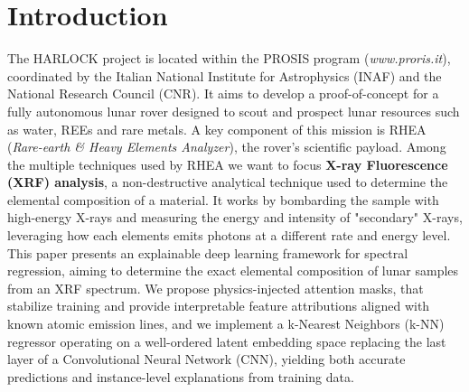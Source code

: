 \documentclass[11pt,twoside]{article}
\begin{document}
\begin{abstract}
Our approach exploits the CNN's latent representation and preservation of spatial features: after training, the final regression layer of the backbone model is replaced by a K-Nearest Neighbors (k-NN) regressor operating directly on the learned embedding space; as a result, every prediction is accompanied by an explanation in the form of the most similar spectra observed during training. This works particularly well thanks to a custom loss function designed to optimize the quality of the learned embedding space, without hindering performances. Furthermore, an attention mask is learned for each predicted element starting from a physics-based initialization, providing easily readable heatmaps as well in the form of a mask-by-weights product. Experimental results show that, in a regression task estimating the composition of soil samples, the average $R^2$ score over the predicted elements stays around 0.9 for both the original approach and the explainable Deep k-NN model.

\end{abstract}


\section{Introduction}
The HARLOCK project is located within the PROSIS program (\textit{www.proris.it}), coordinated by the Italian National Institute for Astrophysics (INAF) and the National Research Council (CNR). It aims to develop a  proof-of-concept for a fully autonomous lunar rover designed to scout and prospect lunar resources such as water, REEs and rare metals.
A key component of this mission is RHEA (\textit{Rare-earth \& Heavy Elements Analyzer}), the rover's scientific payload. Among the multiple techniques used by RHEA we want to focus \textbf{X-ray Fluorescence (XRF) analysis}, a non-destructive analytical technique used to determine the elemental composition of a material. It works by bombarding the sample with high-energy X-rays and measuring the energy and intensity of "secondary" X-rays, leveraging how each elements emits photons at a different rate and energy level.
This paper presents an explainable deep learning framework for spectral regression, aiming to determine the exact elemental composition of lunar samples from an XRF spectrum. We propose physics-injected attention masks, that stabilize training and provide interpretable feature attributions aligned with known atomic emission lines, and we implement a k-Nearest Neighbors (k-NN) regressor operating on a well-ordered latent embedding space replacing the last layer of a Convolutional Neural Network (CNN), yielding both accurate predictions and instance-level explanations from training data.
\end{document}
